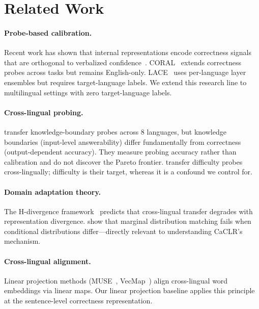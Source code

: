 \documentclass[11pt,a4paper]{article}
\begin{document}
\section{Related Work}

\paragraph{Probe-based calibration.}
Recent work has shown that internal representations encode correctness signals that are orthogonal to verbalized confidence~\citep{miao2026correctness}.
CORAL~\citep{miao2026coral} extends correctness probes across tasks but remains English-only.
LACE~\citep{zhou2024lace} uses per-language layer ensembles but requires target-language labels.
We extend this research line to multilingual settings with zero target-language labels.

\paragraph{Cross-lingual probing.}
\citet{xiao2025crosslingual} transfer knowledge-boundary probes across 8 languages, but knowledge boundaries (input-level answerability) differ fundamentally from correctness (output-dependent accuracy).
They measure probing accuracy rather than calibration and do not discover the Pareto frontier.
\citet{civelli2025difficulty} transfer difficulty probes cross-lingually; difficulty is their target, whereas it is a confound we control for.

\paragraph{Domain adaptation theory.}
The H-divergence framework~\citep{bendavid2010theory} predicts that cross-lingual transfer degrades with representation divergence.
\citet{zhao2019learning} show that marginal distribution matching fails when conditional distributions differ---directly relevant to understanding CaCLR's mechanism.

\paragraph{Cross-lingual alignment.}
Linear projection methods (MUSE~\citep{conneau2018word}, VecMap~\citep{artetxe2018robust}) align cross-lingual word embeddings via linear maps.
Our linear projection baseline applies this principle at the sentence-level correctness representation.
\end{document}
